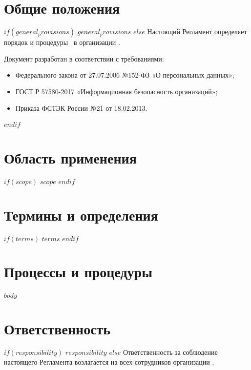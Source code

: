 \documentclass[14pt,a4paper]{extarticle}
\begin{document}
\makeSimpleTitlePage

\mainpagestyle
\tableofcontents
\newpage

\section{Общие положения}
\label{sec:general}

$if(general_provisions)$
$general_provisions$
$else$
Настоящий Регламент определяет порядок и процедуры \docTitle\ в организации \docOrganization.

Документ разработан в соответствии с требованиями:
\begin{itemize}
    \item Федерального закона от 27.07.2006 №152-ФЗ «О персональных данных»;
    \item ГОСТ Р 57580-2017 «Информационная безопасность организаций»;
    \item Приказа ФСТЭК России №21 от 18.02.2013.
\end{itemize}
$endif$

\section{Область применения}
\label{sec:scope}

$if(scope)$
$scope$
$endif$

\section{Термины и определения}
\label{sec:terms}

$if(terms)$
$terms$
$endif$

\section{Процессы и процедуры}
\label{sec:processes}

$body$

\section{Ответственность}
\label{sec:responsibility}

$if(responsibility)$
$responsibility$
$else$
Ответственность за соблюдение настоящего Регламента возлагается на всех сотрудников организации \docOrganization.
\end{document}
